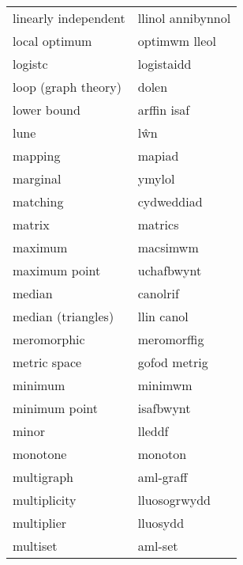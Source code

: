 \begin{supertabular}{p{0.22\textwidth}p{0.22\textwidth}}
             linearly independent &                llinol annibynnol \\
                    local optimum &                    optimwm lleol \\
                          logistc &                       logistaidd \\
              loop (graph theory) &                            dolen \\
                      lower bound &                      arffin isaf \\
                             lune &                              lŵn \\
                          mapping &                           mapiad \\
                         marginal &                           ymylol \\
                         matching &                       cydweddiad \\
                           matrix &                          matrics \\
                          maximum &                         macsimwm \\
                    maximum point &                       uchafbwynt \\
                           median &                         canolrif \\
               median (triangles) &                       llin canol \\
                      meromorphic &                      meromorffig \\
                     metric space &                     gofod metrig \\
                          minimum &                          minimwm \\
                    minimum point &                        isafbwynt \\
                            minor &                           lleddf \\
                         monotone &                          monoton \\
                       multigraph &                        aml-graff \\
                     multiplicity &                     lluosogrwydd \\
                       multiplier &                         lluosydd \\
                         multiset &                          aml-set \\

\end{supertabular}
